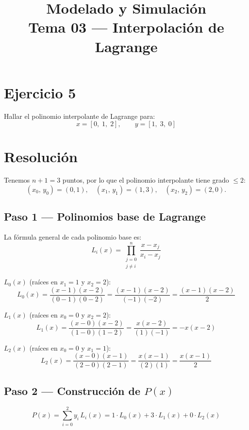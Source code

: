\documentclass[12pt,a4paper]{article}
\title{\textbf{Modelado y Simulaci\'on}\\[0.5em]
       \large Tema 03 --- Interpolaci\'on de Lagrange}
\author{}
\date{}
\begin{document}
\maketitle
\thispagestyle{empty}

\section*{Ejercicio 5}

Hallar el polinomio interpolante de Lagrange para:
\[
  x = [0,\;1,\;2], \qquad y = [1,\;3,\;0]
\]

\section*{Resoluci\'on}

Tenemos $n+1 = 3$ puntos, por lo que el polinomio interpolante
tiene grado $\leq 2$:
\[
  (x_0,\,y_0)=(0,1),\quad
  (x_1,\,y_1)=(1,3),\quad
  (x_2,\,y_2)=(2,0).
\]

\subsection*{Paso 1 \;---\; Polinomios base de Lagrange}

La f\'ormula general de cada polinomio base es:
\[
  L_i(x) = \prod_{\substack{j=0\\j\neq i}}^{n}
            \frac{x - x_j}{x_i - x_j}
\]

\textbf{$L_0(x)$} \;(ra\'ices en $x_1=1$ y $x_2=2$):
\[
  L_0(x)
    = \frac{(x-1)(x-2)}{(0-1)(0-2)}
    = \frac{(x-1)(x-2)}{(-1)(-2)}
    = \frac{(x-1)(x-2)}{2}
\]

\textbf{$L_1(x)$} \;(ra\'ices en $x_0=0$ y $x_2=2$):
\[
  L_1(x)
    = \frac{(x-0)(x-2)}{(1-0)(1-2)}
    = \frac{x(x-2)}{(1)(-1)}
    = -x(x-2)
\]

\textbf{$L_2(x)$} \;(ra\'ices en $x_0=0$ y $x_1=1$):
\[
  L_2(x)
    = \frac{(x-0)(x-1)}{(2-0)(2-1)}
    = \frac{x(x-1)}{(2)(1)}
    = \frac{x(x-1)}{2}
\]

\subsection*{Paso 2 \;---\; Construcci\'on de $P(x)$}

\[
  P(x) = \sum_{i=0}^{2} y_i\, L_i(x)
       = 1\cdot L_0(x) + 3\cdot L_1(x) + 0\cdot L_2(x)
\]
\end{document}
